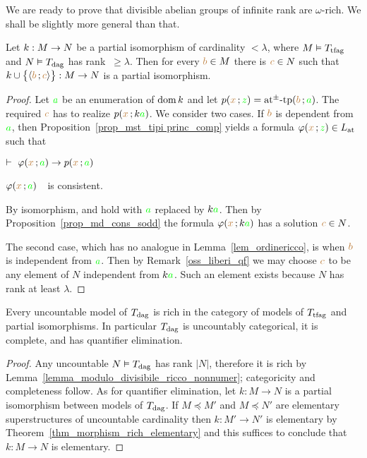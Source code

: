 \documentclass[creche.tex]{subfiles}
\begin{document}
We are ready to prove that divisible abelian groups of infinite rank are $\omega$-rich. We shall be slightly more general than that.

\begin{lemma}\label{lemma_modulo_divisibile_ricco_nonnumer}
Let $k:M\imp N$ be a partial isomorphism of cardinality $<\lambda$, where $M\models T_{\rm tfag}$ and $N\models T_{\rm dag}$ has rank $\ \ge\lambda$. Then for every ${\mr b}\in M$ there is ${\mr c}\in N$ such that $k\cup\big\{\<{\mr b}\,;{\mr c}\>\big\}:M\imp N$ is a partial isomorphism.
\end{lemma}

\begin{proof}
Let ${\gr a}$ be an enumeration of $\dom k$ and let $p({\mr x}\,;{\gr z})=\atpmtp({\mr b}\,;{\gr a})$.  The required ${\mr c}$ has to realize $p({\mr x}\,;k{\gr a})$. We consider two cases. If ${\mr b}$ is dependent from ${\gr a}$, then Proposition~\ref{prop_mst_tipi princ_comp} yields a formula $\phi({\mr x}\,;{\gr z})\in\atL$ such that 

\noindent{}\hspace{5ex} $\proves\ \phi({\mr x}\,;{\gr a})\imp p({\mr x}\,;{\gr a})$

\noindent{}\hspace{5ex} $\phi({\mr x}\,;{\gr a})$\ \ is consistent.

By isomorphism,   and  hold with ${\gr a}$ replaced by $k{\gr a}$. Then by Proposition~\ref{prop_md_cons_sodd} the formula $\phi({\mr x}\,;k{\gr a})$ has a solution ${\mr c} \in N$.

The second case, which has no analogue in Lemma~\ref{lem_ordinericco}, is when ${\mr b}$ is independent from ${\gr a}$. Then by   Remark~\ref{oss_liberi_qf} we may choose ${\mr c}$ to be any element of $N$ independent from $k{\gr a}$. Such an element exists because $N$ has rank at least $\lambda$. 
\end{proof}

\begin{corollary}\label{corol_ModDivUltraOmog}
Every uncountable model of $T_{\rm dag}$ is rich in the category of models of $T_{\rm tfag}$ and partial isomorphisms. In particular $T_{\rm dag}$ is uncountably categorical, it is complete, and has quantifier elimination.
\end{corollary}
\begin{proof}
Any uncountable $N\models T_{\rm dag}$ has rank $|N|$, therefore it is rich by Lemma~\ref{lemma_modulo_divisibile_ricco_nonnumer}; categoricity and completeness follow. As for quantifier elimination, let $k:M\to N$ is a partial isomorphism between models of $T_{\rm dag}$. If $M\preceq M'$ and $M\preceq N'$ are elementary superstructures of uncountable cardinality then $k:M'\to N'$ is elementary by Theorem~\ref{thm_morphism_rich_elementary} and this suffices to conclude that  $k:M\to N$ is elementary. 
\end{proof}
\end{document}
